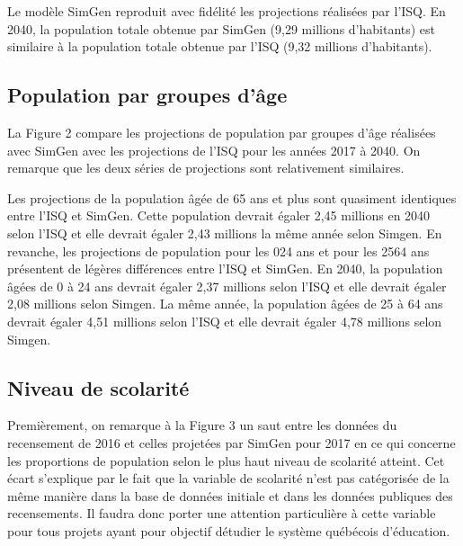 \documentclass[letterpaper,10pt,french]{sphinxmanual}
\begin{document}
Le modèle SimGen reproduit avec fidélité les projections réalisées par l’ISQ. En 2040, la population totale obtenue par SimGen (9,29 millions d’habitants) est similaire à la population totale obtenue par l’ISQ (9,32 millions d’habitants).


\subsection{Population par groupes d’âge}
\label{\detokenize{resultats:population-par-groupes-d-age}}
\begin{figure}[htbp]
\centering

\noindent{}
\end{figure}

La Figure 2 compare les projections de population par groupes d’âge réalisées avec SimGen avec les projections de l’ISQ pour les années 2017 à 2040.
On remarque que les deux séries de projections sont relativement similaires.

Les projections de la population âgée de 65 ans et plus sont quasiment identiques entre l’ISQ et SimGen.
Cette population devrait égaler 2,45 millions en 2040 selon l’ISQ et elle devrait égaler 2,43 millions la même année selon Simgen.
En revanche, les projections de population pour les 0\sphinxhyphen{}24 ans  et pour les 25\sphinxhyphen{}64 ans présentent de légères différences entre l’ISQ et SimGen.
En 2040, la population âgées de 0 à 24 ans devrait égaler 2,37 millions selon l’ISQ et elle devrait égaler 2,08 millions selon Simgen.
La même année, la population âgées de 25 à 64 ans devrait égaler 4,51 millions selon l’ISQ et elle devrait égaler 4,78 millions selon Simgen.


\subsection{Niveau de scolarité}
\label{\detokenize{resultats:niveau-de-scolarite}}
\begin{figure}[htbp]
\centering

\noindent{}
\end{figure}

Premièrement, on remarque à la Figure 3 un saut entre les données du recensement de 2016 et celles projetées par SimGen pour 2017 en ce qui concerne les proportions de population selon le plus haut niveau de scolarité atteint. Cet écart s’explique par le fait que la variable de scolarité n’est pas catégorisée de la même manière dans la base de données initiale et dans les données publiques des recensements. Il faudra donc porter une attention particulière à cette variable pour tous projets ayant pour objectif détudier le système québécois d’éducation.
\end{document}
